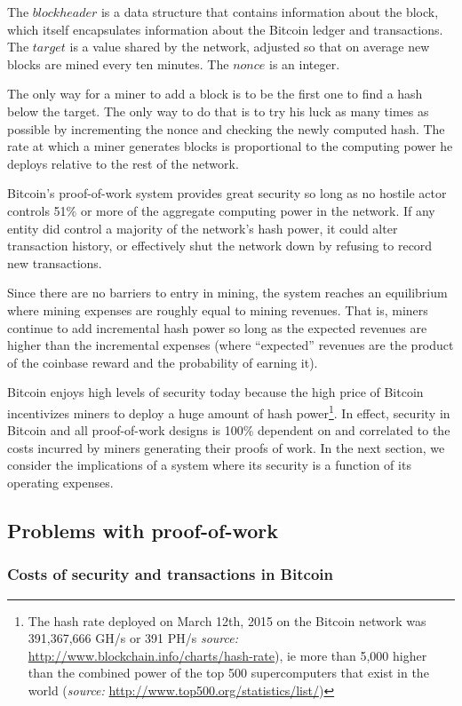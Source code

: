\documentclass[a4paper,11pt]{article}
\begin{document}
The $blockheader$ is a data structure that contains information about the block, which itself encapsulates information about the Bitcoin ledger and transactions. The $target$ is a value shared by the network, adjusted so that on average new blocks are mined every ten minutes. The $nonce$ is an integer. 

The only way for a miner to add a block is to be the first one to find a hash below the target. The only way to do that is to try his luck as many times as possible by incrementing the nonce and checking the newly computed hash. The rate at which a miner generates blocks is proportional to the computing power he deploys relative to the rest of the network. 

Bitcoin's proof-of-work system provides great security so long as no hostile actor controls 51\% or more of the aggregate computing power in the network. If any entity did control a majority of the network's hash power, it could alter transaction history, or effectively shut the network down by refusing to record new transactions. 

Since there are no barriers to entry in mining, the system reaches an equilibrium where mining expenses are roughly equal to mining revenues. That is, miners continue to add incremental hash power so long as the expected revenues are higher than the incremental expenses (where ``expected'' revenues are the product of the coinbase reward and the probability of earning it).

Bitcoin enjoys high levels of security today because the high price of Bitcoin incentivizes miners to deploy a huge amount of hash power\footnote{The hash rate deployed on March 12th, 2015 on the Bitcoin network was 391,367,666 GH/s or 391 PH/s \textit{source:} \url{http://www.blockchain.info/charts/hash-rate}), ie more than 5,000 higher than the combined power of the top 500 supercomputers that exist in the world (\textit{source:} \url{http://www.top500.org/statistics/list/})}. In effect, security in Bitcoin and all proof-of-work designs is 100\% dependent on and correlated to the costs incurred by miners generating their proofs of work. 
In the next section, we consider the implications of a system where its security is a function of its operating expenses. 

\subsection{Problems with proof-of-work}
\subsubsection{Costs of security and transactions in Bitcoin}
\end{document}
